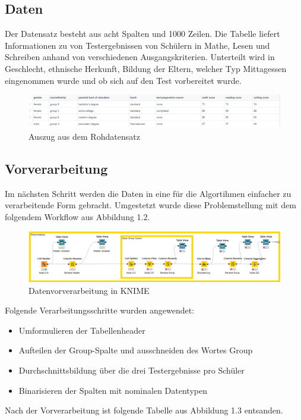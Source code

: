 \documentclass[12pt,					%
							 oneside,			%
							 a4paper,			%
							 halfparskip,		%
							 liststotoc,			%
							 bibtotoc,			%
							 fleqn,				%
							 pointlessnumbers]	%
							 {scrreprt}
\begin{document}
	\subsection{Daten}
	Der Datensatz besteht aus acht Spalten und 1000 Zeilen.  Die Tabelle liefert Informationen zu von Testergebnissen von Schülern in Mathe, Lesen und Schreiben anhand von verschiedenen Ausgangskriterien. Unterteilt wird in Geschlecht, ethnische Herkunft, Bildung der Eltern, welcher Typ Mittagessen eingenommen wurde und ob sich auf den Test vorbereitet wurde. 
	\begin{figure}[!h]
		\includegraphics[scale=0.65]{pictures/roh.png}
		\caption{Auszug aus dem Rohdatensatz}
	\end{figure}
	\subsection{Vorverarbeitung}
	Im nächsten Schritt werden die Daten in eine für die Algortihmen einfacher zu verarbeitende Form gebracht. Umgestetzt wurde diese Problemstellung mit dem folgendem Workflow aus Abbildung 1.2.
	
	\begin{figure}[!h]
		\includegraphics[scale=0.50]{pictures/preprocessing.png}
		\caption{Datenvorverarbeitung in KNIME}
	\end{figure}
	
	Folgende Verarbeitungsschritte wurden angewendet:
	\begin{itemize}
	\item Umformulieren der Tabellenheader
	\item Aufteilen der Group-Spalte und ausschneiden des Wortes Group
	\item Durchschnittsbildung über die drei Testergebnisse pro Schüler
	\item Binarisieren der Spalten mit nominalen Datentypen
	\end{itemize}
	\newpage
	Nach der Vorverarbeitung ist folgende Tabelle aus Abbildung 1.3 entsanden.
	
\end{document}
